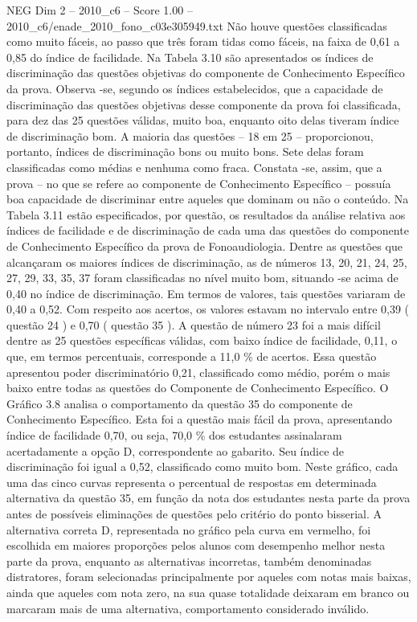 \begin{textsample}{NEG Dim 2 – 2010\_c6 – Score 1.00 – 2010\_c6/enade\_2010\_fono\_c03e305949.txt}
Não houve questões classificadas como muito fáceis, ao passo que três foram tidas como fáceis, na faixa de 0,61 a 0,85 do índice de facilidade.
Na Tabela 3.10 são apresentados os índices de discriminação das questões objetivas do componente de Conhecimento Específico da prova.
Observa -se, segundo os índices estabelecidos, que a capacidade de discriminação das questões objetivas desse componente da prova foi classificada, para dez das 25 questões válidas, muito boa, enquanto oito delas tiveram índice de discriminação bom.
A maioria das questões – 18 em 25 – proporcionou, portanto, índices de discriminação bons ou muito bons.
Sete delas foram classificadas como médias e nenhuma como fraca.
Constata -se, assim, que a prova – no que se refere ao componente de Conhecimento Específico – possuía boa capacidade de discriminar entre aqueles que dominam ou não o conteúdo.
Na Tabela 3.11 estão especificados, por questão, os resultados da análise relativa aos índices de facilidade e de discriminação de cada uma das questões do componente de Conhecimento Específico da prova de Fonoaudiologia.
Dentre as questões que alcançaram os maiores índices de discriminação, as de números 13, 20, 21, 24, 25, 27, 29, 33, 35, 37 foram classificadas no nível muito bom, situando -se acima de 0,40 no índice de discriminação.
Em termos de valores, tais questões variaram de 0,40 a 0,52.
Com respeito aos acertos, os valores estavam no intervalo entre 0,39 ( questão 24 ) e 0,70 ( questão 35 ).
A questão de número 23 foi a mais difícil dentre as 25 questões específicas válidas, com baixo índice de facilidade, 0,11, o que, em termos percentuais, corresponde a 11,0 \% de acertos.
Essa questão apresentou poder discriminatório 0,21, classificado como médio, porém o mais baixo entre todas as questões do Componente de Conhecimento Específico.
O Gráfico 3.8 analisa o comportamento da questão 35 do componente de Conhecimento Específico.
Esta foi a questão mais fácil da prova, apresentando índice de facilidade 0,70, ou seja, 70,0 \% dos estudantes assinalaram acertadamente a opção D, correspondente ao gabarito.
Seu índice de discriminação foi igual a 0,52, classificado como muito bom.
Neste gráfico, cada uma das cinco curvas representa o percentual de respostas em determinada alternativa da questão 35, em função da nota dos estudantes nesta parte da prova antes de possíveis eliminações de questões pelo critério do ponto bisserial.
A alternativa correta D, representada no gráfico pela curva em vermelho, foi escolhida em maiores proporções pelos alunos com desempenho melhor nesta parte da prova, enquanto as alternativas incorretas, também denominadas distratores, foram selecionadas principalmente por aqueles com notas mais baixas, ainda que aqueles com nota zero, na sua quase totalidade deixaram em branco ou marcaram mais de uma alternativa, comportamento considerado inválido.

\end{textsample}
